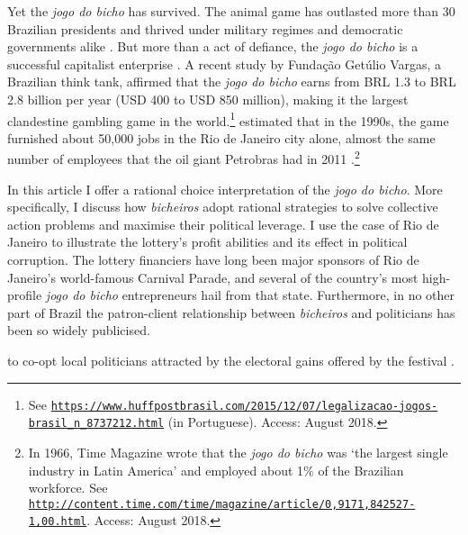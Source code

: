 \documentclass[a4paper,12pt]{article}
\begin{document}
Yet the \emph{jogo do bicho} has survived. The animal game has outlasted more than 30 Brazilian presidents and thrived under military regimes and democratic governments alike \citep{jupiara2015poroes}. But more than a act of defiance, the \emph{jogo do bicho} is a successful capitalist enterprise \citep{labronici2014sorteio, magalhaes2005ganhou}. A recent study by Fundação Getúlio Vargas, a Brazilian think tank, affirmed that the \emph{jogo do bicho} earns from BRL 1.3 to BRL 2.8 billion per year (USD 400 to USD 850 million), making it the largest clandestine gambling game in the world.\footnote{See \href{https://www.huffpostbrasil.com/2015/12/07/legalizacao-jogos-brasil_n_8737212.html}{\texttt{https://www.huffpostbrasil.com/2015/12/07/legalizacao-jogos-brasil\_n\_8737212.html}} (in Portuguese). Access: August 2018.} \citet[171]{schneider1996brazil} estimated that in the 1990s, the game furnished about 50,000 jobs in the Rio de Janeiro city alone, almost the same number of employees that the oil giant Petrobras had in 2011 \citep{exame2013petrobras}.\footnote{In 1966, Time Magazine wrote that the \emph{jogo do bicho} was `the largest single industry in Latin America' and employed about 1\% of the Brazilian workforce. See \href{http://content.time.com/time/magazine/article/0,9171,842527-1,00.html}{\texttt{http://content.time.com/time/magazine/article/0,9171,842527-1,00.html}}. Access: August 2018.}

In this article I offer a rational choice interpretation of the \emph{jogo do bicho}. More specifically, I discuss how \emph{bicheiros} adopt rational strategies to solve collective action problems and maximise their political leverage. I use the case of Rio de Janeiro to illustrate the lottery's profit abilities and its effect in political corruption. The lottery financiers have long been major sponsors of Rio de Janeiro's world-famous Carnival Parade, and several of the country's most high-profile \emph{jogo do bicho} entrepreneurs hail from that state. Furthermore, in no other part of Brazil the patron-client relationship between \emph{bicheiros} and politicians has been so widely publicised.  

 to co-opt local politicians attracted by the electoral gains offered by the festival \citep{cavalcanti2006carnaval, queiroz1992carnaval}.   	 
\end{document}
